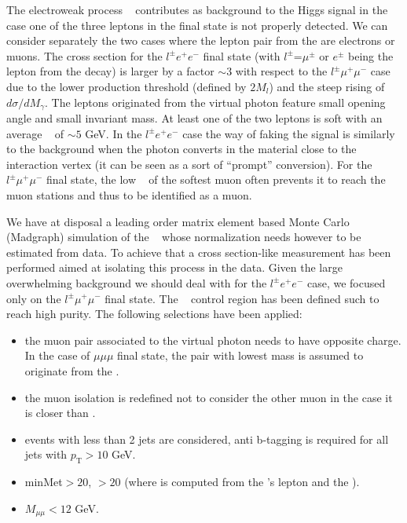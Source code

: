 The electroweak process \Wgstar~ contributes as background to the Higgs signal in the case one of the 
three leptons in the final state is not properly detected. 
We can consider separately the two cases where the lepton pair from the \Astar are electrons
or muons. The cross section for the \ensuremath{l^{\pm}e^{+}e^{-}} final state
(with \ensuremath{l^{\pm}}=\ensuremath{\mu^{\pm}} or \ensuremath{e^{\pm}} being the lepton from the \W decay) 
is larger by a factor $\sim3$ with respect to the \ensuremath{l^{\pm}\mu^{+}\mu^{-}} case
due to the lower production threshold 
(defined by \ensuremath{2M_{l}}) and the steep rising of \ensuremath{d\sigma/dM_{\gamma}}.
The leptons originated from the virtual photon feature small opening angle and small invariant mass.
At least one of the two leptons is soft with an average \pt~ of $\sim5$ GeV.
In the \ensuremath{l^{\pm}e^{+}e^{-}} case the way of faking the signal is similarly to the \wgamma background 
when the photon converts in the material close to the interaction vertex 
(it can be seen as a sort of ``prompt'' conversion). 
For the \ensuremath{l^{\pm}\mu^{+}\mu^{-}} final state, the low \pt~ of the softest muon often prevents
it to reach the muon stations and thus to be identified as a muon.

We have at disposal a leading order matrix element based Monte Carlo (Madgraph) simulation
of the \Wgstar~ whose normalization needs however to be estimated from data.
To achieve that a cross section-like measurement has been performed 
aimed at isolating this process in the data.
Given the large overwhelming background we should deal with for the \ensuremath{l^{\pm}e^{+}e^{-}} 
case, we focused only on the \ensuremath{l^{\pm}\mu^{+}\mu^{-}} final state.
The \Wgstar~ control region has been defined such to reach high purity. 
The following selections have been applied:
\begin{itemize}
\item the muon pair associated to the virtual photon needs to have opposite charge. In the case of
\ensuremath{\mu\mu\mu} final state, the pair with lowest mass is assumed to originate from the \Astar.
\item the muon isolation is redefined not to consider the other muon in the case it is closer than .
\item events with less than 2 jets are considered, anti b-tagging is required for all jets with \ensuremath{p_\mathrm{T}>10} GeV.
\item minMet$>20$, \mt$>20$ (where \mt is computed from the \W's lepton and the \met).
\item \ensuremath{M_{\mu\mu}<12} GeV.
\end{itemize} 

